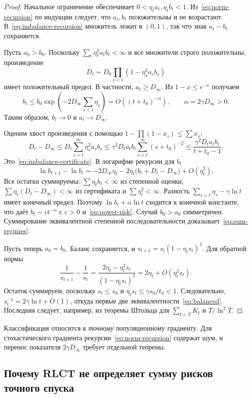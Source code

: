 \begin{proof}
Начальное ограничение обеспечивает $0<\eta_ta_t,\eta_tb_t<1$.
Из~\eqref{eq:norm-recursion} по индукции следует, что $a_t,b_t$ положительны
и не возрастают. В~\eqref{eq:imbalance-recursion} множитель лежит в $(0,1)$,
так что знак $a_t-b_t$ сохраняется.

Пусть $a_0>b_0$. Поскольку $\sum_t\eta_t^2a_tb_t<\infty$ и все множители
строго положительны, произведение
\[
 D_t=D_0\prod_{s<t}(1-\eta_s^2a_sb_s)
\]
имеет положительный предел. В частности, $a_t\ge D_\infty$.
Из $1-x\le e^{-x}$ получаем
\[
 b_t\le b_0\exp\left(-2D_\infty\sum_{s<t}\eta_s\right)
       =O((t+t_0)^{-\alpha}),\qquad\alpha=2\gamma D_\infty>0.
\]
Таким образом, $b_t\to0$ и $a_t\to D_\infty$.

Оценим хвост произведения с помощью $1-\prod(1-x_s)\le\sum x_s$:
\[
 D_t-D_\infty
 \le D_t\sum_{s=t}^\infty\eta_s^2a_sb_s
 \le\gamma^2D_ta_tb_t\sum_{s=t}^\infty(s+t_0)^{-2}
 \le\frac{\gamma^2D_ta_tb_t}{t+t_0-1}.
\]
Это~\eqref{eq:imbalance-certificate}. В логарифме рекурсии для $b_t$
\[
 \ln b_{t+1}-\ln b_t
 =-2D_\infty\eta_t
   -2\eta_t\bigl(b_t+D_t-D_\infty\bigr)+O(\eta_t^2).
\]
Все остатки суммируемы: $\sum\eta_tb_t<\infty$ из степенной оценки,
$\sum\eta_t(D_t-D_\infty)<\infty$ из сертификата и
$\sum\eta_t^2<\infty$. Разность
$\sum_{s<t}\eta_s-\gamma\ln t$ имеет конечный предел. Поэтому
$\ln b_t+\alpha\ln t$ сходится к конечной константе, что даёт
$b_t\sim c t^{-\alpha}$ с $c>0$ и~\eqref{eq:power-risk}.
Случай $b_0>a_0$ симметричен. Суммирование эквивалентной степенной
последовательности доказывает~\eqref{eq:sum-regimes}.

Пусть теперь $a_0=b_0$. Баланс сохраняется, и
$s_{t+1}=s_t(1-\eta_ts_t)^2$. Для обратной нормы
\[
 \frac1{s_{t+1}}-\frac1{s_t}
 =\frac{2\eta_t-\eta_t^2s_t}{(1-\eta_ts_t)^2}
 =2\eta_t+O(\eta_t^2s_t).
\]
Остаток суммируем, поскольку $s_t\le s_0$ и
$\eta_ts_t\le\gamma s_0/t_0<1$. Следовательно,
$s_t^{-1}=2\gamma\ln t+O(1)$, откуда первые две
эквивалентности~\eqref{eq:balanced}. Последняя следует, например,
из теоремы Штольца для $\sum_{t<T}K_t$ и $T/\ln^2T$.
\end{proof}

Классификация относится к \emph{точному} популяционному градиенту. Для
стохастического градиента рекурсии~\eqref{eq:norm-recursion} содержат шум,
и перенос показателя $2\gamma D_\infty$ требует отдельной теоремы.

\subsection{Почему RLCT не определяет сумму рисков точного спуска}

